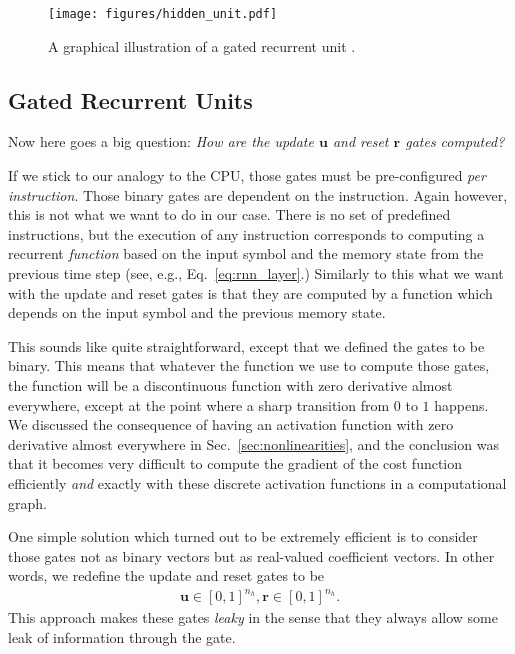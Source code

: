 \documentclass{report}
\newcommand{\vect}[1]{\mathbf{#1}}
\newcommand{\vu}[0]{\vect{u}}
\newcommand{\vr}[0]{\vect{r}}
\begin{document}
\begin{figure}[ht]
    \centering
    \begin{minipage}{0.50\textwidth}
        \centering
        \texttt{[image: figures/hidden\_unit.pdf]}
    \end{minipage}
    \hfill
    \begin{minipage}{0.47\textwidth}
        \caption{
            A graphical illustration of a gated recurrent
            unit \citep{Cho-et-al-EMNLP2014}.
        }
        \label{fig:gru}
    \end{minipage}
\end{figure}

\subsection{Gated Recurrent Units}
\label{sec:gru}

Now here goes a big question: {\em How are the update $\vu$ and reset $\vr$
gates computed?}

If we stick to our analogy to the CPU, those gates must be pre-configured {\em
per instruction}. Those binary gates are dependent on the instruction. Again
however, this is not what we want to do in our case. There is no set of
predefined instructions, but the execution of any instruction corresponds to
computing a recurrent {\em function} based on the input symbol and the memory
state from the previous time step (see, e.g., Eq.~\eqref{eq:rnn_layer}.)
Similarly to this what we want with the update and reset gates is that they are
computed by a function which depends on the input symbol and the previous memory
state.

This sounds like quite straightforward, except that we defined the gates to be
binary. This means that whatever the function we use to compute those gates, the
function will be a discontinuous function with zero derivative almost
everywhere, except at the point where a sharp transition from $0$ to $1$
happens. We discussed the consequence of having an activation function with zero
derivative almost everywhere in Sec.~\ref{sec:nonlinearities}, and the
conclusion was that it becomes very difficult to compute the gradient of the
cost function efficiently {\em and} exactly with these discrete activation
functions in a computational graph.

One simple solution which turned out to be extremely efficient is to consider
those gates not as binary vectors but as real-valued coefficient vectors. In
other words, we redefine the update and reset gates to be
\begin{align*}
    \vu \in \left[ 0, 1 \right]^{n_h}, \vr \in \left[ 0, 1\right]^{n_h}.
\end{align*}
This approach makes these gates {\em leaky} in the sense that they always allow
some leak of information through the gate.
\end{document}

